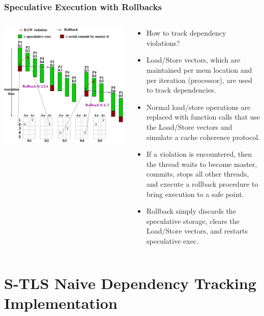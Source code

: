 \documentclass{beamer}
\newcommand{\emp}[1]{\textcolor{DikuRed}{ #1}}
\begin{document}
\begin{frame}[fragile,t]
  \frametitle{Speculative Execution with Rollbacks}

\begin{columns}
\includegraphics[width=47ex]{Figures/FigsTLS/Rollback.pdf}\pause
{}
\begin{scriptsize}
\begin{itemize}
\item \emp{How to track dependency violations?}
\item Load/Store vectors, which are maintained per mem location
        and per iteration (processor), are used to track 
        dependencies.
\item Normal load/store operations are replaced with 
        function calls that use the Load/Store vectors 
        and simulate a cache coherence protocol.
\item If a violation is encountered, then the thread
        waits to become master, commits, stops all other threads,
        and execute a \emp{rollback procedure} to bring
        execution to a safe point.
\item Rollback simply discards the speculative storage,
        clears the Load/Store vectors, and restarts
        speculative exec. 
\end{itemize}
\end{scriptsize}
\end{columns}

\end{frame}

\section{S-TLS Naive Dependency Tracking Implementation}
\end{document}
